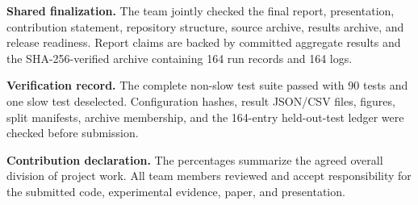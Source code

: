 \documentclass[10pt,a4paper]{article}
\begin{document}
\vspace{5pt}
\textbf{Shared finalization.} The team jointly checked the final report,
presentation, contribution statement, repository structure, source archive,
results archive, and release readiness. Report claims are backed by committed
aggregate results and the SHA-256-verified archive containing 164 run records and
164 logs.

\textbf{Verification record.} The complete non-slow test suite passed with 90
tests and one slow test deselected. Configuration hashes, result JSON/CSV files,
figures, split manifests, archive membership, and the 164-entry held-out-test
ledger were checked before submission.

\textbf{Contribution declaration.} The percentages summarize the agreed overall
division of project work. All team members reviewed and accept responsibility
for the submitted code, experimental evidence, paper, and presentation.
\end{document}
